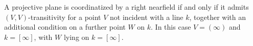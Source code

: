 A projective plane is coordinatized by a right nearfield if and only if it admits $(V,V)$-transitivity for a point $V$ not incident with a line $k$, together with an additional condition on a further point $W$ on $k$. In this case $V = (\infty)$ and $k = [\infty]$, with $W$ lying on $k = [\infty]$.
